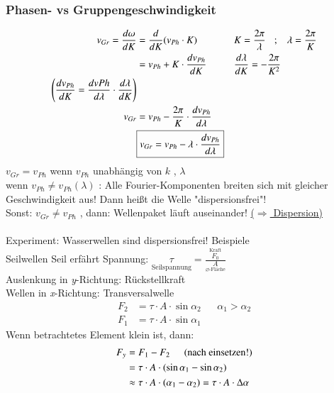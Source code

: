  \subsubsection{Phasen- vs Gruppengeschwindigkeit}
 \begin{align*}
 	v_{Gr} = \frac{d\omega}{dK} &= \frac{d}{dK} (v_{Ph} \cdot K) &&K=\frac{2\pi}{\lambda} \hspace{3mm};\hspace{3mm}\lambda=\frac{2\pi}{K}\\
 	&=v_{Ph} + K \cdot \frac{dv_{Ph}}{dK} &&\frac{d\lambda}{dK} = - \frac{2\pi}{K^2}\\
 	\left( \frac{dv_{Ph}}{dK} = \frac{dv{Ph}}{d\lambda} \cdot \frac{d\lambda}{dK}  \right) \\
 	v_{Gr} &= v_{Ph} -  \frac{2\pi}{K} \cdot \frac{ dv_{Ph} }{d\lambda} \\
 	&\boxed{v_{Gr} = v_{Ph} - \lambda \cdot \frac{ dv_{Ph} }{d\lambda} }
 \end{align*}
 $ v_{Gr}  = v _{Ph} $ wenn $ v_{Ph} $ unabhängig von $ k $ , $ \lambda $\\
 wenn $ v_{Ph} \neq v_{Ph}(\lambda) $ : Alle Fourier-Komponenten breiten sich mit gleicher Geschwindigkeit aus! Dann heißt die Welle "dispersionsfrei"!\\
 Sonst: $ v_{Gr} \neq v_{Ph} $ , dann: Wellenpaket läuft auseinander! \underline{($ \Rightarrow $ Dispersion)}\\
 \hfill \\
 Experiment: Wasserwellen sind dispersionsfrei!
 \bild
 Beispiele\\
 Seilwellen
 \bild
 Seil erfährt Spannung: $ \underset{\text{Seilspannung}}{\tau} = \frac{\overset{\text{Kraft}}{F_0}}{\underset{\varnothing \text{-Fläche}}{A}} $\\
 Auslenkung in \emph{y}-Richtung: Rückstellkraft\\
 Wellen in \emph{x}-Richtung: Transversalwelle\\
 \begin{align*}
 	F_2 &= \tau\cdot A \cdot\sin\alpha_2 &&\alpha_1>\alpha_2\\
 	F_1 &= \tau\cdot A \cdot\sin\alpha_1
 \end{align*}
 Wenn betrachtetes Element klein ist, dann:
 \begin{align*}
 	F_y &= F_1 - F_2 \hspace{5mm} \text{(nach einsetzen!)}\\
 	&= \tau \cdot A \cdot (\sin\alpha_1 - \sin\alpha_2)\\
 	&\approx\tau \cdot A \cdot ( \alpha_1 - \alpha_2) = \tau \cdot A \cdot \Delta\alpha
 \end{align*}
